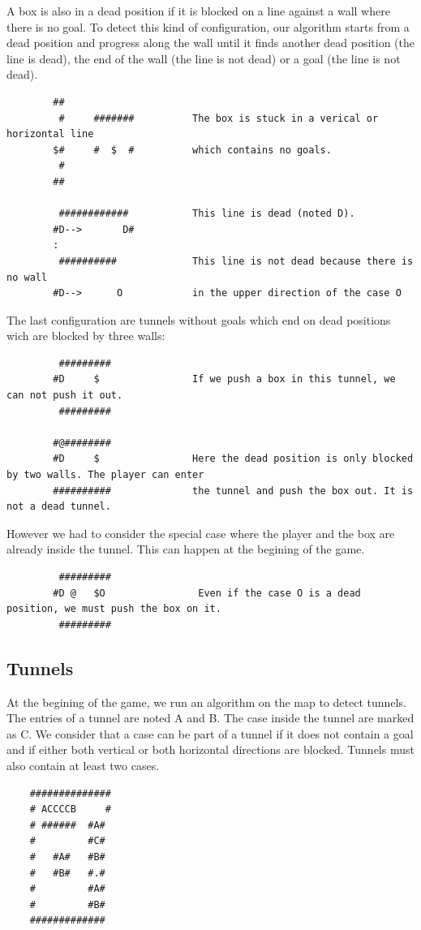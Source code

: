 \documentclass[a4paper,10pt]{article}
\begin{document}
			A box is also in a dead position if it is blocked on a line against a wall where there is no goal.
			To detect this kind of configuration, our algorithm starts from a dead position and progress along the wall until it finds
			another dead position (the line is dead), the end of the wall (the line is not dead) or a goal (the line is not dead).
		\begin{verbatim}
	    ##           
	     #     #######			The box is stuck in a verical or horizontal line
	    $#     #  $  #			which contains no goals.
	     #            
	    ##         

		 ############			This line is dead (noted D).
		#D-->       D#
		:
		 ##########				This line is not dead because there is no wall 
		#D-->      O            in the upper direction of the case O
	    \end{verbatim}

			The last configuration are tunnels without goals which end on dead positions wich are blocked by three walls:
		\begin{verbatim}
		 #########
		#D     $                If we push a box in this tunnel, we can not push it out.
		 #########

		#@########
		#D     $                Here the dead position is only blocked by two walls. The player can enter
		##########              the tunnel and push the box out. It is not a dead tunnel.
		\end{verbatim}

		However we had to consider the special case where the player and the box are already inside the tunnel. 
		This can happen at the begining of the game.
		\begin{verbatim}
		 #########
		#D @   $O                Even if the case O is a dead position, we must push the box on it.
		 #########
		\end{verbatim}

	\subsection{Tunnels}
	At the begining of the game, we run an algorithm on the map to detect tunnels.
	The entries of a tunnel are noted A and B. The case inside the tunnel are marked as C.
	We consider that a case can be part of a tunnel if it does not contain a goal 
	and if either both vertical or both horizontal directions are blocked.
	Tunnels must also contain at least two cases.
	\begin{verbatim}
    ##############
    # ACCCCB     #
    # ######  #A#
    #         #C#
    #   #A#   #B#
    #   #B#   #.#
    #         #A#
    #         #B#
    #############
	\end{verbatim}
\end{document}

